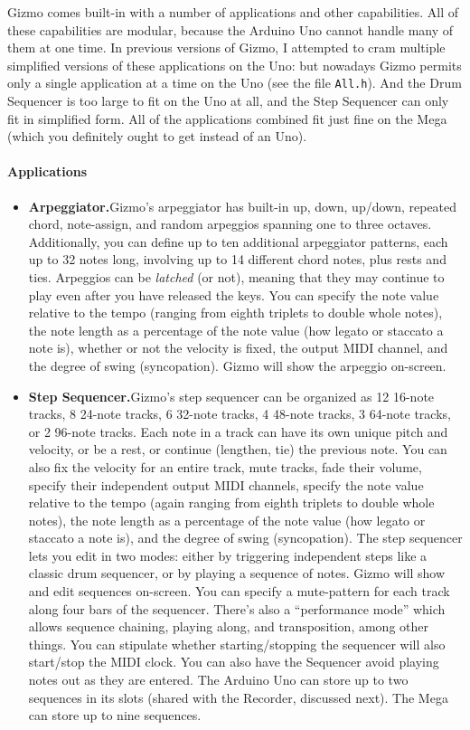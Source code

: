 \documentclass{article}
\begin{document}
Gizmo comes built-in with a number of applications and other capabilities.  All of these capabilities are modular, because the Arduino Uno cannot handle many of them at one time.  In previous versions of Gizmo, I attempted to cram multiple simplified versions of these applications on the Uno: but nowadays Gizmo permits only a single application at a time on the Uno (see the file \texttt{All.h}).  And the Drum Sequencer is too large to fit on the Uno at all, and the Step Sequencer can only fit in simplified form.  All of the applications combined fit just fine on the Mega (which you definitely ought to get instead of an Uno).


\paragraph{Applications}
\begin{itemize}
\item {\bf Arpeggiator.}\quad Gizmo's arpeggiator has built-in up, down, up/down, repeated chord, note-assign, and random arpeggios spanning one to three octaves.  Additionally, you can define up to ten additional arpeggiator patterns, each up to 32 notes long, involving up to 14 different chord notes, plus rests and ties.  Arpeggios can be {\it latched} (or not), meaning that they may continue to play even after you have released the keys.  You can specify  the note value relative to the tempo (ranging from eighth triplets to double whole notes), the note length as a percentage of the note value (how legato or staccato a note is), whether or not the velocity is fixed, the output MIDI channel, and the degree of swing (syncopation).  Gizmo will show the arpeggio on-screen.

\item {\bf Step Sequencer.}\quad Gizmo's step sequencer can be organized as 12 16-note tracks, 8 24-note tracks, 6 32-note tracks, 4 48-note tracks, 3 64-note tracks, or 2 96-note tracks.  Each note in a track can have its own unique pitch and velocity, or be a rest, or continue (lengthen, tie) the previous note.  You can also fix the velocity for an entire track, mute tracks, fade their volume, specify their independent output MIDI channels, specify the note value relative to the tempo (again ranging from eighth triplets to double whole notes), the note length as a percentage of the note value (how legato or staccato a note is), and the degree of swing (syncopation).   The step sequencer lets you edit in two modes: either by triggering independent steps like a classic drum sequencer, or by playing a sequence of notes.  Gizmo will show and edit sequences on-screen.   You can specify a mute-pattern for each track along four bars of the sequencer.  There's also a ``performance mode'' which allows sequence chaining, playing along, and transposition, among other things.  You can stipulate whether starting/stopping the sequencer will also start/stop the MIDI clock.  You can also have the Sequencer avoid playing notes out as they are entered.  The Arduino Uno can store up to two sequences in its slots (shared with the Recorder, discussed next).  The Mega can store up to nine sequences.  


\end{itemize}
\end{document}
